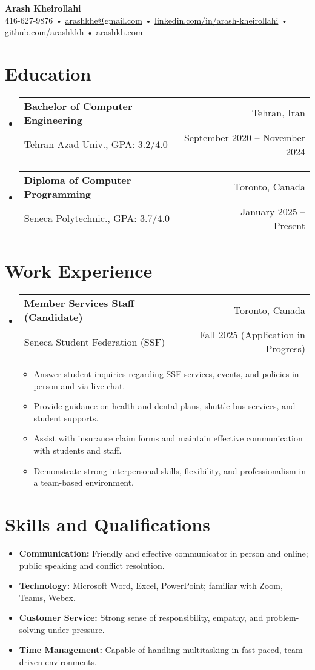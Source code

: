 \documentclass[letterpaper,11pt]{article}
\makeatletter
\let\hrefWithoutArrow\href
\renewcommand{\href}[2]{\hrefWithoutArrow{#1}{\ifthenelse{\equal{#2}{}}{ }{#2\ }\raisebox{.15ex}{\footnotesize \faExternalLink*}}}
\newcommand{\resumeItemNH}[1]{
  \item\small{
    {#1 \vspace{-2pt}}
  }
}
\newcommand{\resumeSubheading}[4]{
  \vspace{-1pt}\item
    \begin{tabular*}{\textwidth}{l@{\extracolsep{\fill}}r}
      \textbf{#1} & #2 \\
      \small#3 & \small #4 \\
    \end{tabular*}\vspace{-6pt}
}
\newcommand{\resumeSubHeadingListStart}{\begin{itemize}[leftmargin=0pt,label={}]}
\newcommand{\resumeSubHeadingListEnd}{\end{itemize}}
\newcommand{\resumeItemListStart}{\begin{itemize}}
\newcommand{\resumeItemListEnd}{\end{itemize}}
\makeatother
\begin{document}
{\LARGE \textbf{Arash Kheirollahi}}\\[0.5em]
\small
416-627-9876 •
\hrefWithoutArrow{mailto:arashkhe@gmail.com}{arashkhe@gmail.com} •
\hrefWithoutArrow{https://www.linkedin.com/in/arash-kheirollahi/}{linkedin.com/in/arash-kheirollahi} •
\hrefWithoutArrow{https://github.com/arashkkh}{github.com/arashkkh} •
\hrefWithoutArrow{https://www.arashkh.com}{arashkh.com}\\[0.6em]

\section{Education}
  \resumeSubHeadingListStart
    \resumeSubheading
      {Bachelor of Computer Engineering}{Tehran, Iran}
      {Tehran Azad Univ., GPA: 3.2/4.0}{September 2020 -- November 2024}
  \resumeSubHeadingListEnd
  \resumeSubHeadingListStart
    \resumeSubheading
      {Diploma of Computer Programming}{Toronto, Canada}
      {Seneca Polytechnic., GPA: 3.7/4.0}{January 2025 -- Present}
  \resumeSubHeadingListEnd

\section{Work Experience}
  \resumeSubHeadingListStart
    \resumeSubheading
      {Member Services Staff (Candidate)}{Toronto, Canada}
      {Seneca Student Federation (SSF)}{Fall 2025 (Application in Progress)}
      \resumeItemListStart
        \resumeItemNH{Answer student inquiries regarding SSF services, events, and policies in-person and via live chat.}
        \resumeItemNH{Provide guidance on health and dental plans, shuttle bus services, and student supports.}
        \resumeItemNH{Assist with insurance claim forms and maintain effective communication with students and staff.}
        \resumeItemNH{Demonstrate strong interpersonal skills, flexibility, and professionalism in a team-based environment.}
      \resumeItemListEnd
  \resumeSubHeadingListEnd

\section{Skills and Qualifications}
  \begin{itemize}[leftmargin=*, itemsep=-2pt]
    \item \textbf{Communication:} Friendly and effective communicator in person and online; public speaking and conflict resolution.
    \item \textbf{Technology:} Microsoft Word, Excel, PowerPoint; familiar with Zoom, Teams, Webex.
    \item \textbf{Customer Service:} Strong sense of responsibility, empathy, and problem-solving under pressure.
    \item \textbf{Time Management:} Capable of handling multitasking in fast-paced, team-driven environments.
  \end{itemize}
\end{document}
